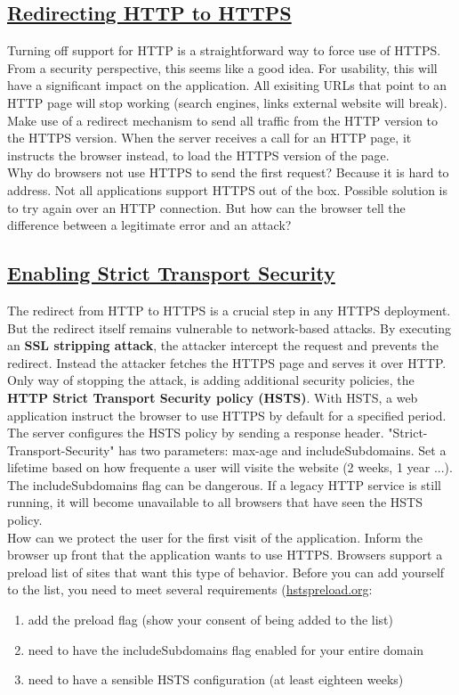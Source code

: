 \documentclass[titlepage]{article}
\begin{document}
    \subsection{\href{https://youtu.be/I_7v3iA0IOQ}{Redirecting HTTP to HTTPS}}
    Turning off support for HTTP is a straightforward way to force use of HTTPS. From a security perspective, this seems like a good idea. For usability, this will have a significant impact on the application. All exisiting URLs that point to an HTTP page will stop working (search engines, links external website will break).\\
    Make use of a redirect mechanism to send all traffic from the HTTP version to the HTTPS version. When the server receives a call for an HTTP page, it instructs the browser instead, to load the HTTPS version of the page.\\
    Why do browsers not use HTTPS to send the first request? Because it is hard to address. Not all applications support HTTPS out of the box. Possible solution is to try again over an HTTP connection. But how can the browser tell the difference between a legitimate error and an attack?
    \subsection{\href{https://youtu.be/wWaZd_3DAV0}{Enabling Strict Transport Security}}
    The redirect from HTTP to HTTPS is a crucial step in any HTTPS deployment. But the redirect itself remains vulnerable to network-based attacks. By executing an \textbf{SSL stripping attack}, the attacker intercept the request and prevents the redirect. Instead the attacker fetches the HTTPS page and serves it over HTTP. Only way of stopping the attack, is adding additional security policies, the \textbf{HTTP Strict Transport Security policy (HSTS)}. With HSTS, a web application instruct the browser to use HTTPS by default for a specified period.\\
    The server configures the HSTS policy by sending a response header. "Strict-Transport-Security" has two parameters: max-age and includeSubdomains. Set a lifetime based on how frequente a user will visite the website (2 weeks, 1 year ...). The includeSubdomains flag can be dangerous. If a legacy HTTP service is still running, it will become unavailable to all browsers that have seen the HSTS policy.\\
    How can we protect the user for the first visit of the application. Inform the browser up front that the application wants to use HTTPS. Browsers support a preload list of sites that want this type of behavior. Before you can add yourself to the list, you need to meet several requirements (\url{hstspreload.org}:
    \begin{enumerate}
        \item add the preload flag (show your consent of being added to the list)
        \item need to have the includeSubdomains flag enabled for your entire domain
        \item need to have a sensible HSTS configuration (at least eighteen weeks)
    \end{enumerate}
\end{document}
